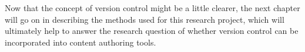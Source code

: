 Now that the concept of version control might be a little clearer, the next chapter will go on in describing the methods used for this research project, which will ultimately help to answer the research question of whether version control can be incorporated into content authoring tools.




